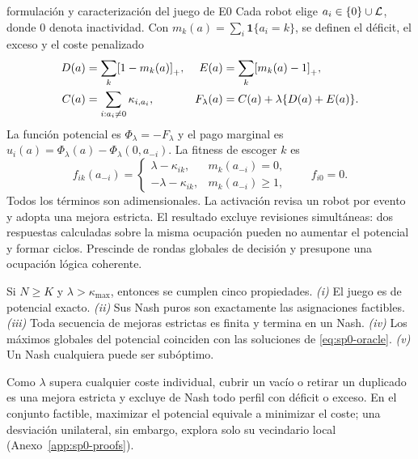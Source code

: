 \begin{contribucion}{formulación y caracterización del juego de E0}
Cada robot elige $a_i\in\{0\}\cup\mathcal{L}$, donde $0$ denota inactividad. Con $m_k(a)=\sum_i\mathbf1\{a_i=k\}$, se definen el déficit, el exceso y el coste penalizado
\begin{equation}
\begin{aligned}
 D(a)&=\sum_k\mathopen{\textnormal{[}}1-m_k(a)\mathclose{\textnormal{]}}_{+}, &
 E(a)&=\sum_k\mathopen{\textnormal{[}}m_k(a)-1\mathclose{\textnormal{]}}_{+},\\
 C(a)&=\sum_{i:a_i\neq0}\kappa_{i,a_i}, &
 F_\lambda(a)&=C(a)+\lambda\{D(a)+E(a)\}.
\end{aligned}
\label{eq:sp0-penalized-cost}
\end{equation}
La función potencial es $\Phi_\lambda=-F_\lambda$ y el pago marginal es $u_i(a)=\Phi_\lambda(a)-\Phi_\lambda(0,a_{-i})$. La fitness de escoger $k$ es
\begin{equation}
 f_{ik}(a_{-i})=
 \begin{cases}
  \lambda-\kappa_{ik},&m_k(a_{-i})=0,\\
  -\lambda-\kappa_{ik},&m_k(a_{-i})\geq1,
 \end{cases}
 \qquad f_{i0}=0.
 \label{eq:sp0-action-fitness}
\end{equation}
Todos los términos son adimensionales. La activación revisa un robot por evento y adopta una mejora estricta. El resultado excluye revisiones simultáneas: dos respuestas calculadas sobre la misma ocupación pueden no aumentar el potencial y formar ciclos. Prescinde de rondas globales de decisión y presupone una ocupación lógica coherente.

\begin{proposicion}
\label{thm:sp0-nash-characterization}
Si $N\geq K$ y $\lambda>\kappa_{\max}$, entonces se cumplen cinco propiedades. \emph{(i)} El juego es de potencial exacto. \emph{(ii)} Sus Nash puros son exactamente las asignaciones factibles. \emph{(iii)} Toda secuencia de mejoras estrictas es finita y termina en un Nash. \emph{(iv)} Los máximos globales del potencial coinciden con las soluciones de \eqref{eq:sp0-oracle}. \emph{(v)} Un Nash cualquiera puede ser subóptimo.
\end{proposicion}
\end{contribucion}
Como \(\lambda\) supera cualquier coste individual, cubrir un vacío o retirar un duplicado es una mejora estricta y excluye de Nash todo perfil con déficit o exceso. En el conjunto factible, maximizar el potencial equivale a minimizar el coste; una desviación unilateral, sin embargo, explora solo su vecindario local (Anexo~\ref{app:sp0-proofs}).

